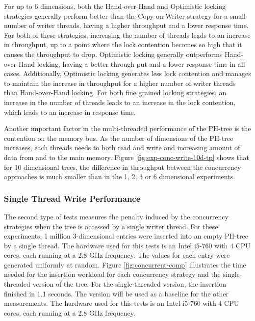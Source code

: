 \documentclass[11pt,a4paper]{globis-book}
\begin{document}
For up to 6 dimensions, both the Hand-over-Hand and Optimistic locking strategies generally perform better than the Copy-on-Writer strategy for a small number of writer threads, having a higher throughput and a lower response time. For both of these strategies, increasing the number of threads leads to an increase in throughput, up to a point where the lock contention becomes so high that it causes the throughput to drop. Optimistic locking generally outperforms Hand-over-Hand locking, having a better through put and a lower response time in all cases. Additionally, Optimistic locking generates less lock contention and manages to maintain the increase in throughput for a higher number of writer threads than Hand-over-Hand locking. For both fine grained locking strategies, an increase in the number of threads leads to an increase in the lock contention, which leads to an increase in response time.

Another important factor in the multi-threaded performance of the PH-tree is the contention on the memory bus. As the number of dimensions of the PH-tree increases, each threads needs to both read and write and increasing amount of data from and to the main memory. Figure \ref{fig:exp-conc-write-10d-tp} shows that for 10 dimensional trees, the difference in throughput between the concurrency approaches is much smaller than in the 1, 2, 3 or 6 dimensional experiments. 

\subsubsection{Single Thread Write Performance}

The second type of tests measures the penalty induced by the concurrency strategies when the tree is accessed by a single writer thread. For these experiments, 1 million 3-dimensional entries were inserted into an empty PH-tree by a single thread. The hardware used for this tests is an Intel i5-760 with 4 CPU cores, each running at a 2.8 GHz frequency. The values for each entry were generated uniformly at random. Figure \ref{fig:concurrent-comp} illustrates the time needed for the insertion workload for each concurrency strategy and the single-threaded version of the tree. For the single-threaded version, the insertion finished in 1.1 seconds. The version will be used as a baseline for the other measurements. The hardware used for this tests is an Intel i5-760 with 4 CPU cores, each running at a 2.8 GHz frequency. 
\end{document}

